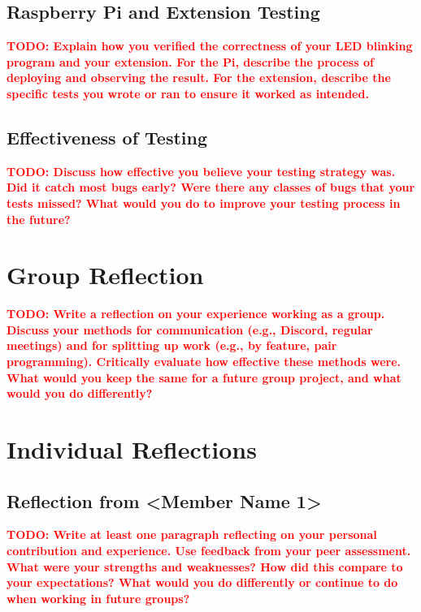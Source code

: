 \documentclass[11pt]{article}
\newcommand{\todo}[1]{\textcolor{red}{\textbf{TODO: #1}}}
\begin{document}
\subsection{Raspberry Pi and Extension Testing}
\todo{Explain how you verified the correctness of your LED blinking program and your extension. For the Pi, describe the process of deploying and observing the result. For the extension, describe the specific tests you wrote or ran to ensure it worked as intended.}

\subsection{Effectiveness of Testing}
\todo{Discuss how effective you believe your testing strategy was. Did it catch most bugs early? Were there any classes of bugs that your tests missed? What would you do to improve your testing process in the future?}


\section{Group Reflection}
\todo{Write a reflection on your experience working as a group. Discuss your methods for communication (e.g., Discord, regular meetings) and for splitting up work (e.g., by feature, pair programming). Critically evaluate how effective these methods were. What would you keep the same for a future group project, and what would you do differently?}


\section{Individual Reflections}
\subsection{Reflection from <Member Name 1>}
\todo{Write at least one paragraph reflecting on your personal contribution and experience. Use feedback from your peer assessment. What were your strengths and weaknesses? How did this compare to your expectations? What would you do differently or continue to do when working in future groups?}
\end{document}
